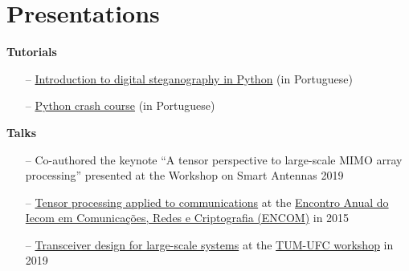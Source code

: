 \section{Presentations}

{\bf Tutorials}\\
\begin{itemize}
	\item[--] \href{https://github.com/lnribeiro/setic2015/blob/master/esteganografia.ipynb}{Introduction to digital steganography in Python} (in Portuguese)
	\item[--] \href{https://github.com/lnribeiro/setic2015/blob/master/intropython.ipynb}{Python crash course} (in Portuguese)
\end{itemize}

{\bf Talks}\\
\begin{itemize}
	\item[--] Co-authored the keynote ``A tensor perspective to large-scale MIMO array processing'' presented at the  Workshop on Smart Antennas 2019
	\item[--] \href{https://github.com/lnribeiro/lnribeiro.github.io/blob/master/assets/pdf/encom15.pdf}{Tensor processing applied to communications} at the \href{https://iecom.org.br/encom2015/#}{Encontro Anual do Iecom em Comunicaç\~{o}es, Redes e Criptografia (ENCOM)} in 2015
	\item[--] \href{http://lnribeiro.github.io/assets/pdf/tum19.pdf}{Transceiver design for large-scale systems} at the \href{http://www.msv.ei.tum.de/workshop-tum-ufc/}{TUM-UFC workshop} in 2019
\end{itemize}